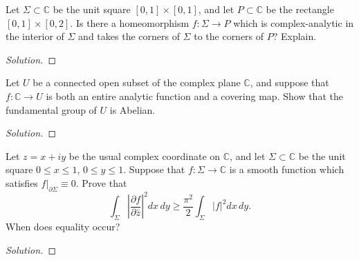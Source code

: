 \documentclass[10pt]{article}
\newenvironment{soln}{\begin{proof}[Solution]}{\end{proof}}
\begin{document}
\begin{problem}
[1997 A-I-3]
Let $\Sigma\subset\mathbb{C}$ be the unit square $[0,1]\times[0,1]$, and let $P\subset\mathbb{C}$ be the rectangle $[0,1]\times[0,2]$. Is there a homeomorphism $f:\Sigma\rightarrow P$ which is complex-analytic in the interior of $\Sigma$ and takes the corners of $\Sigma$ to the corners of $P$? Explain.
\end{problem}

\begin{soln}

\end{soln}



\begin{problem}
[1997 A-II-4]
Let $U$ be a connected open subset of the complex plane $\mathbb{C}$, and suppose that $f:\mathbb{C}\rightarrow U$ is both an entire analytic function and a covering map. Show that the fundamental group of $U$ is Abelian.
\end{problem}

\begin{soln}

\end{soln}



\begin{problem}
[1997 A-II-5]
Let $z=x+iy$ be the usual complex coordinate on $\mathbb{C}$, and let $\Sigma\subset\mathbb{C}$ be the unit square $0\leq x\leq 1$, $0\leq y\leq 1$. Suppose that $f:\Sigma\rightarrow\mathbb{C}$ is a smooth function which satisfies $f|_{\partial\Sigma}\equiv 0$. Prove that
$$
\int_\Sigma\left|\frac{\partial f}{\partial \bar z}\right|^2dx\,dy\geq \frac{\pi^2}{2}\int_\Sigma |f|^2dx\,dy.
$$
When does equality occur?
\end{problem}

\begin{soln}

\end{soln}
\end{document}
